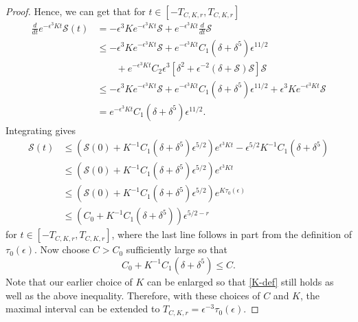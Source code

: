 \documentclass[oneside,reqno]{amsart}
\begin{document}
\begin{proof}
	Hence, we can get that for \(t \in [-T_{C,K,r}, T_{C,K,r}]\) 
	\begin{equation*}
		\begin{aligned}
			\frac d {dt} e^{-\epsilon^3 K t} \mathcal S(t) &= - \epsilon^3 K e^{-\epsilon^3 K t} \mathcal S  + e^{-\epsilon^3 K t} \frac d {dt} \mathcal S \\
			&\leq - \epsilon^3 K e^{-\epsilon^3 K t} \mathcal S  + e^{-\epsilon^3 K t}C_1(\delta + \delta^5) \epsilon^{11/2} \\
			&\qquad+ e^{-\epsilon^3 K t}C_2 \epsilon^3\left[ \delta^2 + \epsilon^{-2}(\delta + \mathcal S) \mathcal S \right]\mathcal S \\
			&\leq - \epsilon^3 K e^{-\epsilon^3 K t} \mathcal S  +  e^{-\epsilon^3 K t}C_1(\delta + \delta^5) \epsilon^{11/2} + \epsilon^3 K e^{-\epsilon^3 K t}\mathcal S \\
			&= e^{-\epsilon^3 K t}C_1(\delta + \delta^5) \epsilon^{11/2}.
		\end{aligned}
	\end{equation*}
	Integrating gives
	\begin{equation*} 
		\begin{aligned}
			\mathcal S(t) &\leq \left( \mathcal S(0) + K^{-1} C_1 (\delta+\delta^5) \epsilon^{5/2} \right) e^{\epsilon^3 K t} - \epsilon^{5/2} K^{-1} C_1 (\delta + \delta^5) \\
			&\leq \left( \mathcal S(0) + K^{-1} C_1 (\delta+\delta^5) \epsilon^{5/2} \right) e^{\epsilon^3 K t} \\
			&\leq \left( \mathcal S(0) + K^{-1} C_1 (\delta+\delta^5) \epsilon^{5/2} \right) e^{ K \tau_0(\epsilon)} \\
			&\leq \left( C_0 + K^{-1} C_1 (\delta+\delta^5)  \right) \epsilon^{5/2 -r}
		\end{aligned}
	\end{equation*}
	for \(t \in [-T_{C,K,r}, T_{C,K,r}]\), where the last line follows in part from the definition of \(\tau_0(\epsilon)\). Now choose \(C> C_0\) sufficiently large so that 
	\begin{equation*}
		C_0 + K^{-1} C_1(\delta + \delta^5) \leq C.
	\end{equation*}
	Note that our earlier choice of \(K\) can be enlarged so that \cref{K-def} still holds as well as the above inequality. Therefore, with these choices of \(C\) and \(K\), the maximal interval can be extended to \(T_{C,K,r} = \epsilon^{-3} \tau_0(\epsilon) \). 
\end{proof}
\end{document}
